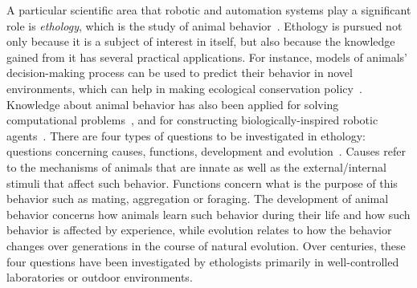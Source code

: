  
A particular scientific area that robotic and automation systems play a significant role is \textit{ethology}, which is 
the study of animal behavior~\cite{Bolhuis_2004}. Ethology is pursued not only because it is a subject of interest in itself, but also because the knowledge gained from it has several practical applications. For instance, models of animals' decision-making process can be used to predict their behavior in novel environments, which can help in making ecological conservation policy~\cite{Sutherland1998}. Knowledge about animal behavior has also been applied for solving computational problems~\citep{Floreano2008}, and for constructing biologically-inspired robotic agents~\citep{Meyer2008}. There are four types of questions to be investigated in ethology: questions concerning causes, functions, development and evolution~\cite{Bolhuis_2004}. Causes refer to the mechanisms of animals that are innate as well as the external/internal stimuli that affect such behavior. Functions concern what is the purpose of this behavior such as mating, aggregation or foraging. The development of animal behavior concerns how animals learn such behavior during their life and how such behavior is affected by experience, while evolution relates to how the behavior changes over generations in the course of natural evolution. Over centuries, these four questions have been investigated by ethologists primarily in well-controlled laboratories or outdoor environments. 

